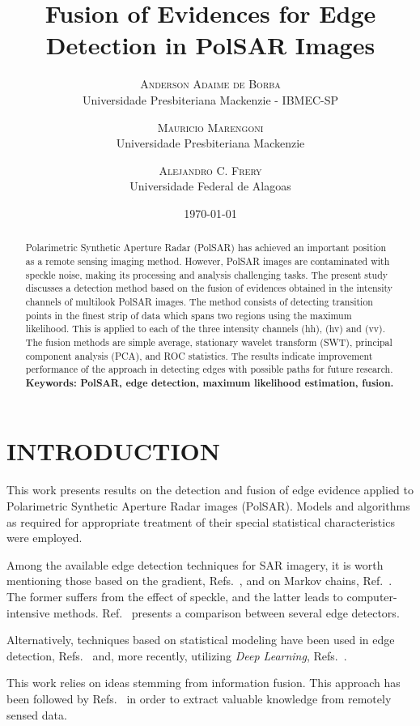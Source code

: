 \documentclass[a4paper,12pt]{article}
\title{Fusion of Evidences for Edge Detection in PolSAR Images }
\author{%
	\textsc{Anderson Adaime de Borba}\\ %
	\normalsize Universidade Presbiteriana Mackenzie - IBMEC-SP \\ %
	\and
	\textsc{Mauricio Marengoni}\\%
	\normalsize Universidade Presbiteriana Mackenzie \\ %
        \and
	\textsc{Alejandro C. Frery}\\%
	\normalsize Universidade Federal de Alagoas \\ %
}
\date{\today}
\begin{document}
	\maketitle
	\begin{abstract}
Polarimetric Synthetic Aperture Radar (PolSAR) has achieved an important position as a remote sensing imaging method. 
However, PolSAR images are contaminated with speckle noise, making its processing and analysis challenging tasks. 
The present study discusses a detection method based on the fusion of evidences obtained in the intensity channels of multilook PolSAR images.
The method consists of detecting transition points in the finest strip of data which spans two regions using the maximum likelihood.
This is applied to each of the three intensity channels (hh), (hv) and (vv). 
The fusion methods are simple average, stationary wavelet transform (SWT), principal component analysis (PCA), and ROC statistics.  
The results indicate improvement performance of the approach in detecting edges with possible paths for future research.
		\textbf{Keywords: PolSAR, edge detection, maximum likelihood estimation, fusion.} 
	\end{abstract}
	
	\section{INTRODUCTION} \label{sec:introduction}
		  This work presents results on the detection and fusion of edge evidence applied to Polarimetric Synthetic Aperture Radar images (PolSAR). Models and algorithms as required for appropriate treatment of their special statistical characteristics were employed.

Among the available edge detection techniques for SAR imagery, it is worth mentioning those based on the gradient, Refs.~\cite{tlb, obw, flmc, fyf}, and on Markov chains, Ref.~\cite{bf}. The former suffers from the effect of speckle, and the latter leads to computer-intensive methods. Ref.~\cite{gfn} presents a comparison between several edge detectors. 

Alternatively, techniques based on statistical modeling have been used in edge detection, Refs.~\cite{gmbf, fbgm, horrit, gfn} and, more recently,  utilizing \textit{Deep Learning}, Refs.~\cite{bac, ztmxzxf, tabmm, xstz}.

This work relies on ideas stemming from information fusion.
This approach has been followed by Refs.~\cite{sglmla,sg} in order to extract valuable knowledge from remotely sensed data.
\end{document}
